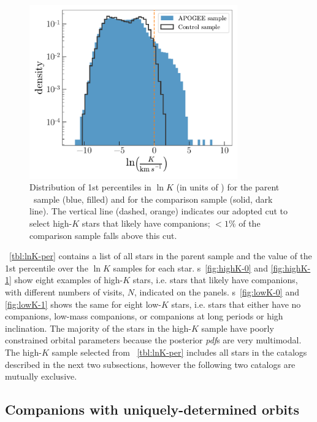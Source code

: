 \documentclass[modern, letterpaper]{aastex62}
\newcommand{\apogee}{\project{\acronym{APOGEE}}}
\newcommand{\pdf}{\textit{pdf}}
\begin{document}
\begin{figure}[h]
\begin{center}
\includegraphics[width=0.8\textwidth]{lnK-percentiles}
\end{center}
\caption{%
Distribution of 1st percentiles in $\ln K$ (in units of \kms) for the parent
\apogee\ sample (blue, filled) and for the comparison sample (solid, dark line).
The vertical line (dashed, orange) indicates our adopted cut to select high-$K$
stars that likely have companions; $<1\%$ of the comparison sample falls above
this cut.
\label{fig:lnK-percentiles}
}
\end{figure}

\tablename~\ref{tbl:lnK-per} contains a list of all stars in the parent sample
and the value of the 1st percentile over the $\ln K$ samples for each star.
\figurename s~\ref{fig:highK-0} and \ref{fig:highK-1} show eight examples of
high-$K$ stars, i.e. stars that likely have companions, with different numbers
of visits, $N$, indicated on the panels.
\figurename s~\ref{fig:lowK-0} and \ref{fig:lowK-1} shows the same for eight
low-$K$ stars, i.e. stars that either have no companions, low-mass companions,
or companions at long periods or high inclination.
The majority of the stars in the high-$K$ sample have poorly constrained orbital
parameters because the posterior \pdf s are very multimodal.
The high-$K$ sample selected from \tablename~\ref{tbl:lnK-per} includes all
stars in the catalogs described in the next two subsections, however the
following two catalogs are mutually exclusive.


\subsection{Companions with uniquely-determined orbits}
\label{sec:catalog-unimodal}
\end{document}
